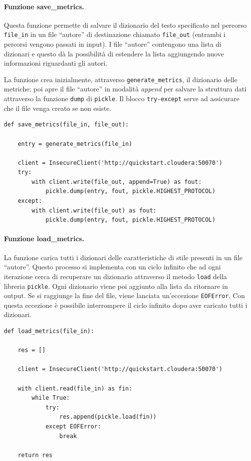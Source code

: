 \documentclass[titlepage]{article}
\begin{document}
\paragraph{Funzione save\_metrics.}
Questa funzione permette di salvare il dizionario del testo specificato nel percorso \texttt{file\_in} in un file ``autore'' di destinazione chiamato \texttt{file\_out} (entrambi i percorsi vengono passati in input). I file ``autore'' contengono una lista di dizionari e questo dà la possibilità di estendere la lista aggiungendo nuove informazioni riguardanti gli autori.

La funzione crea inizialmente, attraverso \texttt{generate\_metrics}, il dizionario delle metriche; poi apre il file ``autore'' in modalità \textit{append} per salvare la struttura dati attraverso la funzione \texttt{dump} di \texttt{pickle}. Il blocco \texttt{try-except} serve ad assicurare che il file venga creato se non esiste.
\begin{verbatim}
def save_metrics(file_in, file_out):

    entry = generate_metrics(file_in)
    
    client = InsecureClient('http://quickstart.cloudera:50070')
    try:
        with client.write(file_out, append=True) as fout:
            pickle.dump(entry, fout, pickle.HIGHEST_PROTOCOL)
    except:
        with client.write(file_out) as fout:
            pickle.dump(entry, fout, pickle.HIGHEST_PROTOCOL)
\end{verbatim}

\paragraph{Funzione load\_metrics.}
La funzione carica tutti i dizionari delle caratteristiche di stile presenti in un file ``autore''. Questo processo si implementa con un ciclo infinito che ad ogni iterazione cerca di recuperare un dizionario attraverso il metodo \texttt{load} della libreria \texttt{pickle}. Ogni dizionario viene poi aggiunto alla lista da ritornare in output. Se si raggiunge la fine del file, viene lanciata un'eccezione \texttt{EOFError}. Con questa eccezione è possibile interrompere il ciclo infinito dopo aver caricato tutti i dizionari.
\begin{verbatim}
def load_metrics(file_in):

    res = []
    
    client = InsecureClient('http://quickstart.cloudera:50070')
    
    with client.read(file_in) as fin:
        while True:
            try:
                res.append(pickle.load(fin))
            except EOFError:
                break
                
    return res
\end{verbatim}
\end{document}
